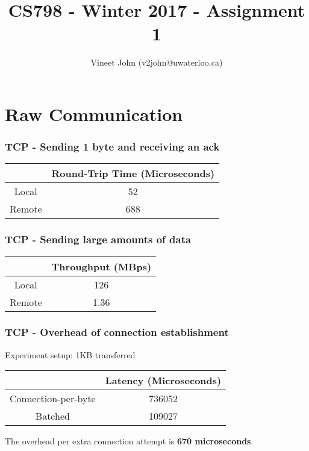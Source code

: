 \documentclass[a4paper]{article}
\title{CS798 - Winter 2017 - Assignment 1}
\author{Vineet John (v2john@uwaterloo.ca)}
\date{}
\begin{document}
\maketitle


\part{Raw Communication}

\section{TCP - Sending 1 byte and receiving an ack}
\begin{center}
	\begin{tabular}{ |c|c| } 
		\hline
		& Round-Trip Time (Microseconds) \\ 
		\hline
		\hline
		Local & 52 \\ 
		\hline
		Remote & 688 \\ 
		\hline
	\end{tabular}
\end{center}


\section{TCP - Sending large amounts of data}
\begin{center}
	\begin{tabular}{ |c|c| } 
		\hline
		& Throughput (MBps) \\ 
		\hline
		\hline
		Local & 126 \\ 
		\hline
		Remote & 1.36 \\ 
		\hline
	\end{tabular}
\end{center}

\section{TCP - Overhead of connection establishment}
Experiment setup: 1KB transferred
\begin{center}
	\begin{tabular}{ |c|c| } 
		\hline
		& Latency (Microseconds) \\ 
		\hline
		\hline
		Connection-per-byte & 736052 \\ 
		\hline
		Batched & 109027 \\ 
		\hline
	\end{tabular}
\end{center}
The overhead per extra connection attempt is \textbf{670 microseconds}.
\end{document}

